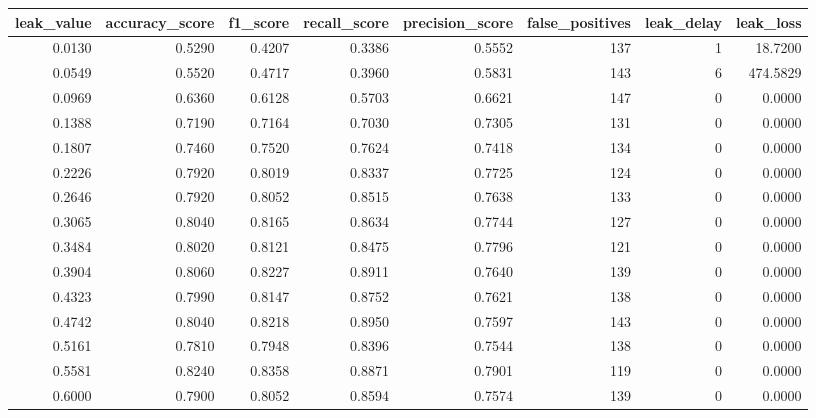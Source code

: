 \begin{tabular}{rrrrrrrr}
\toprule
leak\_value & accuracy\_score & f1\_score & recall\_score & precision\_score & false\_positives & leak\_delay & leak\_loss \\
\midrule
0.0130 & 0.5290 & 0.4207 & 0.3386 & 0.5552 & 137 & 1 & 18.7200 \\
0.0549 & 0.5520 & 0.4717 & 0.3960 & 0.5831 & 143 & 6 & 474.5829 \\
0.0969 & 0.6360 & 0.6128 & 0.5703 & 0.6621 & 147 & 0 & 0.0000 \\
0.1388 & 0.7190 & 0.7164 & 0.7030 & 0.7305 & 131 & 0 & 0.0000 \\
0.1807 & 0.7460 & 0.7520 & 0.7624 & 0.7418 & 134 & 0 & 0.0000 \\
0.2226 & 0.7920 & 0.8019 & 0.8337 & 0.7725 & 124 & 0 & 0.0000 \\
0.2646 & 0.7920 & 0.8052 & 0.8515 & 0.7638 & 133 & 0 & 0.0000 \\
0.3065 & 0.8040 & 0.8165 & 0.8634 & 0.7744 & 127 & 0 & 0.0000 \\
0.3484 & 0.8020 & 0.8121 & 0.8475 & 0.7796 & 121 & 0 & 0.0000 \\
0.3904 & 0.8060 & 0.8227 & 0.8911 & 0.7640 & 139 & 0 & 0.0000 \\
0.4323 & 0.7990 & 0.8147 & 0.8752 & 0.7621 & 138 & 0 & 0.0000 \\
0.4742 & 0.8040 & 0.8218 & 0.8950 & 0.7597 & 143 & 0 & 0.0000 \\
0.5161 & 0.7810 & 0.7948 & 0.8396 & 0.7544 & 138 & 0 & 0.0000 \\
0.5581 & 0.8240 & 0.8358 & 0.8871 & 0.7901 & 119 & 0 & 0.0000 \\
0.6000 & 0.7900 & 0.8052 & 0.8594 & 0.7574 & 139 & 0 & 0.0000 \\
\bottomrule
\end{tabular}
